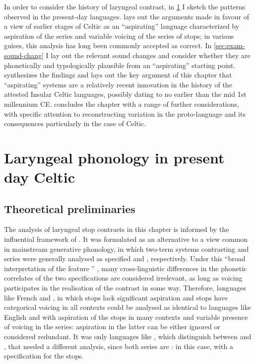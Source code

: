 \documentclass[output=paper,colorlinks,citecolor=brown]{langscibook}
\begin{document}
In order to consider the history of laryngeal contrast, in \cref{sec:laryng-phon-pres} I sketch the patterns observed in the present\hyp day languages.  lays out the arguments made in favour of a view of earlier stages of Celtic as an \enquote{aspirating} language characterized by aspiration of the  series and variable voicing of the  series of stops; in various guises, this analysis has long been commonly accepted as correct. In \cref{sec:exam-sound-chang} I lay out the relevant sound changes and consider whether they are phonetically and typologically plausible from an \enquote{aspirating} starting point.  synthesizes the findings and lays out the key argument of this chapter that \enquote{aspirating} systems are a relatively recent innovation in the history of the attested Insular Celtic languages, possibly dating to no earlier than the mid 1st millennium CE.  concludes the chapter with a range of further considerations, with specific attention to reconstructing variation in the proto\hyp language and its consequences particularly in the case of Celtic.

\section{Laryngeal phonology in present day Celtic}
\label{sec:laryng-phon-pres}

\subsection{Theoretical preliminaries}
\label{sec:theor-prel}

The analysis of laryngeal stop contrasts in this chapter is informed by the influential framework of  \parencite[a term due to][]{honeybone05}. It was formulated as an alternative to a view common in mainstream generative phonology, in which two\hyp term systems contrasting  and  series were generally analysed as specified  and , respectively. Under this \enquote{broad interpretation of the feature } \parencite{hall2001introduction}, many cross\hyp linguistic differences in the phonetic correlates of the two specifications are considered irrelevant, as long as voicing participates in the realisation of the contrast in some way. Therefore, languages like French  and  , in which  stops lack significant aspiration and  stops have categorical voicing in all contexts could be analysed as identical to languages like English  and   with aspiration of the  stops in many contexts and variable presence of voicing in the  series: aspiration in the latter can be either ignored or considered redundant. It was only languages like  , which distinguish between \ipa{[pʰ~tʰ~kʰ]} and \ipa{[p~t~k]}, that needed a different analysis, since both series are : in this case, with a  specification for the  stops.
\end{document}

